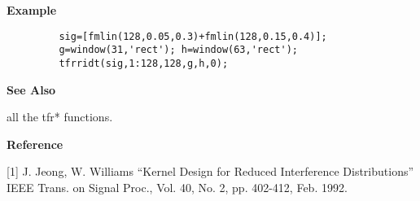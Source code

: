 \newpage

{\bf \large \sf Example}
\begin{verbatim}
         sig=[fmlin(128,0.05,0.3)+fmlin(128,0.15,0.4)];  
         g=window(31,'rect'); h=window(63,'rect');  
         tfrridt(sig,1:128,128,g,h,0);
\end{verbatim}
\vspace*{.5cm}


{\bf \large \sf See Also}\\
\hspace*{1.5cm}
\begin{minipage}[t]{13.5cm}
all the {\ty tfr*} functions.
\end{minipage}
\vspace*{.5cm}


{\bf \large \sf Reference}\\
\hspace*{1.5cm}
\begin{minipage}[t]{13.5cm}
[1] J. Jeong, W. Williams ``Kernel Design for Reduced Interference
Distributions'' IEEE Trans. on Signal Proc., Vol. 40, No. 2, pp. 402-412,
Feb. 1992.
\end{minipage}

